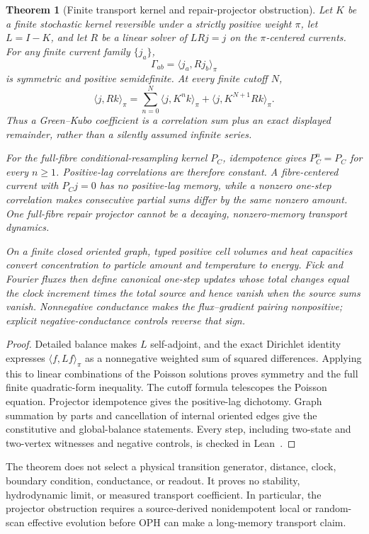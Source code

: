\documentclass[11pt]{article}
\newtheorem{theorem}{Theorem}[section]
\begin{document}
\begin{theorem}[Finite transport kernel and repair-projector obstruction]
\label{thm:finite-transport-kernel}
Let \(K\) be a finite stochastic kernel reversible under a strictly positive
weight \(\pi\), let \(L=I-K\), and let \(R\) be a linear solver of
\(LRj=j\) on the \(\pi\)-centered currents. For any finite current family
\(\{j_a\}\),
\[
  \Gamma_{ab}=\langle j_a,Rj_b\rangle_\pi
\]
is symmetric and positive semidefinite. At every finite cutoff \(N\),
\[
  \langle j,Rk\rangle_\pi
  =\sum_{n=0}^{N}\langle j,K^n k\rangle_\pi
   +\langle j,K^{N+1}Rk\rangle_\pi .
\]
Thus a Green--Kubo coefficient is a correlation sum plus an exact displayed
remainder, rather than a silently assumed infinite series.

For the full-fibre conditional-resampling kernel \(P_C\), idempotence gives
\(P_C^n=P_C\) for every \(n\geq1\). Positive-lag correlations are therefore
constant. A fibre-centered current with \(P_Cj=0\) has no positive-lag
memory, while a nonzero one-step correlation makes consecutive partial sums
differ by the same nonzero amount. One full-fibre repair projector cannot be
a decaying, nonzero-memory transport dynamics.

On a finite closed oriented graph, typed positive cell volumes and heat
capacities convert concentration to particle amount and temperature to
energy. Fick and Fourier fluxes then define canonical one-step updates whose
total changes equal the clock increment times the total source and hence
vanish when the source sums vanish.
Nonnegative conductance makes the flux--gradient pairing nonpositive; explicit
negative-conductance controls reverse that sign.
\end{theorem}

\begin{proof}
Detailed balance makes \(L\) self-adjoint, and the exact Dirichlet identity
expresses \(\langle f,Lf\rangle_\pi\) as a nonnegative weighted sum of squared
differences. Applying this to linear combinations of the Poisson solutions
proves symmetry and the full finite quadratic-form inequality. The cutoff
formula telescopes the Poisson equation. Projector idempotence gives the
positive-lag dichotomy. Graph summation by parts and cancellation of internal
oriented edges give the constitutive and global-balance statements. Every
step, including two-state and two-vertex witnesses and negative controls, is
checked in Lean~\cite{ophrepo}.
\end{proof}

The theorem does not select a physical transition generator, distance,
clock, boundary condition, conductance, or readout. It proves no stability,
hydrodynamic limit, or measured transport coefficient. In particular, the
projector obstruction requires a source-derived nonidempotent local or
random-scan effective evolution before OPH can make a long-memory transport
claim.
\end{document}
